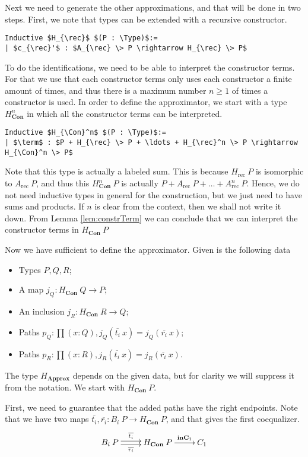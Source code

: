 \documentclass[a4paper,UKenglish]{lipics-v2016}
\newcommand{\Boperator}[1]{\mathrm{\mathbf{#1}}}
\newcommand{\rec}[0]{\operatorname{rec}}
\newcommand{\term}[0]{\textbf{term}}
\newcommand{\Con}[0]{\textbf{Con}}
\newcommand{\Approx}[0]{\textbf{Approx}}
\newcommand{\inC}[0]{\Boperator{inC}}
\newcommand{\Type}[0]{\operatorname{\textsc{Type}}}
\begin{document}
Next we need to generate the other approximations, and that will be done in two steps.
First, we note that types can be extended with a recursive constructor.
\lstset{language=Coq}
\begin{lstlisting}
Inductive $H_{\rec}$ $(P : \Type)$:=
| $c_{\rec}'$ : $A_{\rec} \> P \rightarrow H_{\rec} \> P$
\end{lstlisting}
To do the identifications, we need to be able to interpret the constructor terms.
For that we use that each constructor terms only uses each constructor  a finite amount of times, and thus there is a maximum number $n \geq 1$ of times a constructor is used.
In order to define the approximator, we start with a type $H_{\Con}^n$ in which all the constructor terms can be interpreted.
\lstset{language=Coq}
\begin{lstlisting}
Inductive $H_{\Con}^n$ $(P : \Type)$:=
| $\term$ : $P + H_{\rec} \> P + \ldots + H_{\rec}^n \> P \rightarrow H_{\Con}^n \> P$
\end{lstlisting}

Note that this type is actually a labeled sum.
This is because $H_{\rec} \> P$ is isomorphic to $A_{\rec} \> P$, and thus this $H_{\Con}^n \> P$ is actually $P + A_{\rec} \> P + \ldots + A_{\rec}^n \> P$.
Hence, we do not need inductive types in general for the construction, but we just need to have sums and products.
If $n$ is clear from the context, then we shall not write it down.
From Lemma \ref{lem:constrTerm} we can conclude that we can interpret the constructor terms in $H_{\Con} \> P$

Now we have sufficient to define the approximator.
Given is the following data
\begin{itemize}
        \item Types $P, Q, R$;
        \item A map $j_Q : H_{\Con} \> Q \rightarrow P$;
        \item An inclusion $j_R : H_{\Con} \> R \rightarrow Q$;
        \item Paths $p_Q : \prod (x : Q), j_Q(\overline{t_i} \> x) = j_Q(\overline{r_i} \> x)$;
        \item Paths $p_R : \prod (x : R), j_R(\overline{t_i} \> x) = j_R(\overline{r_i} \> x)$.
\end{itemize}
The type $H_{\Approx}$ depends on the given data, but for clarity we will suppress it from the notation.
We start with $H_{\Con} \> P$.

First, we need to guarantee that the added paths have the right endpoints.
Note that we have two maps $\overline{t_i}, \overline{r_i} : B_i \> P \rightarrow H_{\Con} \> P$, and that gives the first coequalizer.
\[
\xymatrix
{
        B_i \> P \ar@<-.5ex>[r]_-{\overline{r_i}} \ar@<.5ex>[r]^-{\overline{t_i}} & H_{\Con} \> P \ar[r]^-{\inC_1} & C_1
}
\]
\end{document}
